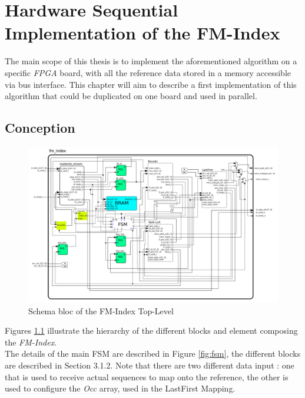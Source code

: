 
\chapter{Hardware Sequential Implementation of the FM-Index} %

\label{Chapter3} %
The main scope of this thesis is to implement the aforementioned algorithm on a specific \textsl{FPGA} board, with all the reference data stored in a memory accessible via bus interface. This chapter will aim to describe a first implementation of this algorithm that could be duplicated on one board and used in parallel.

\section{Conception}

\begin{figure}[H]
    \centering
    \hspace*{-25mm}\includegraphics[scale = 0.45]{Figures/fmindex_top.png}
    \caption{Schema bloc of the FM-Index Top-Level}
    \label{fig:seqschema}
\end{figure}

Figures \ref{fig:seqschema} illustrate the hierarchy of the different blocks and element composing the \textsl{FM-Index}. \\

The details of the main FSM are described in Figure \ref{fig:fsm}, the different blocks are described in Section 3.1.2. Note that there are two different data input : one that is used to receive actual sequences to map onto the reference, the other is used to configure the \textsl{Occ} array, used in the LastFirst Mapping.


